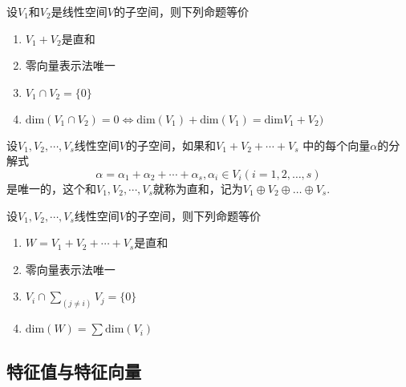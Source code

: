 \begin{theorem}
	设$V_1$和$V_2$是线性空间$V$的子空间，则下列命题等价
		\begin{enumerate}
		\item $V_1+V_2$是直和
		\item 零向量表示法唯一
		\item  $V_1\cap V_2=\{ 0\} $
		\item  $ \mathrm{dim}(V_1\cap V_2)=0 \Leftrightarrow  \mathrm{dim}(V_1)+\mathrm{dim}(V_1)=\mathrm{dim}V_1+V_2)$
	\end{enumerate}
\end{theorem}


\begin{definition}
	设$V_1,V_2,\cdots, V_s$线性空间$V$的子空间，如果和$V_1+V_2+\cdots+ V_s$
	中的每个向量$\alpha$的分解式
	\[
	\alpha=\alpha_1+\alpha_2+\cdots+\alpha_s, \alpha_i \in V_i(i=1,2,\dots, s)
	\]
	是唯一的，这个和$V_1,V_2,\cdots, V_s$就称为直和，记为$V_1\oplus V_2\oplus\dots \oplus V_s.$
\end{definition}


\begin{theorem}
设$V_1,V_2,\cdots, V_s$线性空间$V$的子空间，则下列命题等价
	\begin{enumerate}
		\item $W=V_1+V_2+\cdots+ V_s$是直和
		\item 零向量表示法唯一
		\item  $V_i\cap\sum\limits_{(j\ne i)} V_j=\{ 0\} $
		\item  $ \mathrm{dim}(W)=\sum \mathrm{dim}(V_i)$
	\end{enumerate}
\end{theorem}

\subsection{特征值与特征向量}

